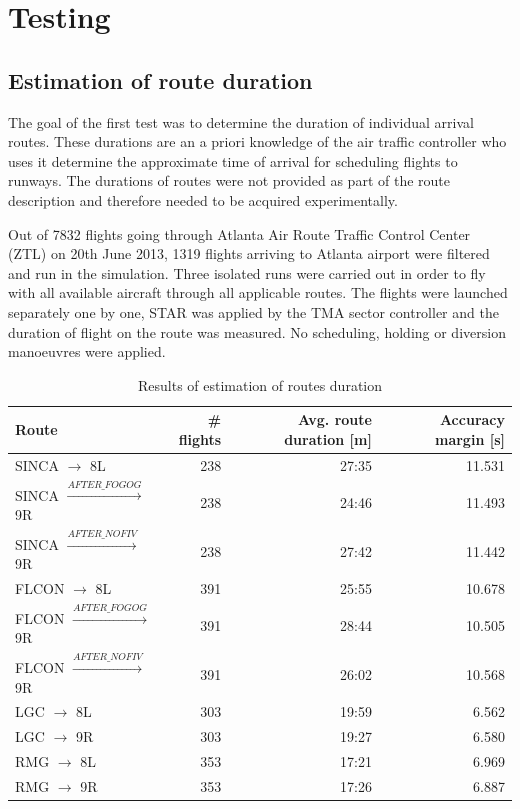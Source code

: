 \chapter{Testing}
\label{section:testing}


\section{Estimation of route duration}

The goal of the first test was to determine the duration of individual arrival routes. These durations are an a priori knowledge of the air traffic controller who uses it determine the approximate time of arrival for scheduling flights to runways. The durations of routes were not provided as part of the route description and therefore needed to be acquired experimentally.

Out of 7832 flights going through Atlanta Air Route Traffic Control Center (ZTL) on 20th June 2013, 1319 flights arriving to Atlanta airport were filtered and run in the simulation. Three isolated runs were carried out in order to fly with all available aircraft through all applicable routes. The flights were launched separately one by one, STAR was applied by the TMA sector controller and the duration of flight on the route was measured. No scheduling, holding or diversion manoeuvres were applied.

\begin{table}[h]
  \centering
\begin{tabular}{ | l | r | r | r | }
\hline
Route   & \# flights & Avg. route duration [m]  & Accuracy margin [s] \\
\hline
SINCA $\rightarrow$ 8L                & 238 & 27:35 & 11.531  \\
SINCA $\xrightarrow{AFTER\_FOGOG}$ 9R & 238 & 24:46 & 11.493  \\
SINCA $\xrightarrow{AFTER\_NOFIV}$ 9R & 238 & 27:42 & 11.442  \\

FLCON $\rightarrow$ 8L                & 391 & 25:55 & 10.678  \\
FLCON $\xrightarrow{AFTER\_FOGOG}$ 9R & 391 & 28:44 & 10.505  \\
FLCON $\xrightarrow{AFTER\_NOFIV}$ 9R & 391 & 26:02 & 10.568  \\

LGC $\rightarrow$ 8L   & 303 & 19:59 & 6.562  \\
LGC $\rightarrow$ 9R   & 303 & 19:27 & 6.580  \\

RMG $\rightarrow$ 8L   & 353 & 17:21 & 6.969  \\
RMG $\rightarrow$ 9R   & 353 & 17:26 & 6.887  \\
\hline
\end{tabular}
  \caption{Results of estimation of routes duration}
  \label{tab:route_duration}
\end{table}

